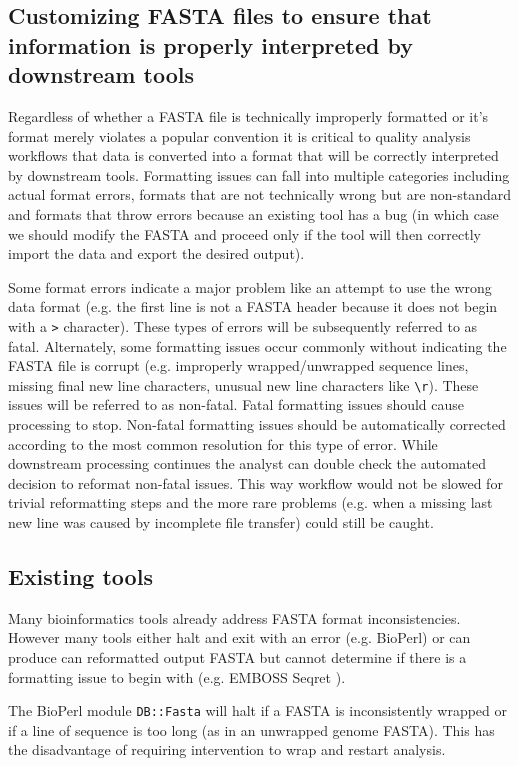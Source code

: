 \subsection{Customizing FASTA files to ensure that information is properly interpreted by downstream tools}

Regardless of whether a FASTA file is technically improperly formatted or it's format merely violates a popular convention it is critical to quality analysis workflows that data is converted into a format that will be correctly interpreted by downstream tools. Formatting issues can fall into multiple categories including actual format errors, formats that are not technically wrong but are non-standard and formats that throw errors because an existing tool has a bug (in which case we should modify the FASTA and proceed only if the tool will then correctly import the data and export the desired output). 

Some format errors indicate a major problem like an attempt to use the wrong data format (e.g. the first line is not a FASTA header because it does not begin with a \verb|>| character). These types of errors will be subsequently referred to as fatal. Alternately, some formatting issues occur commonly without indicating the FASTA file is corrupt (e.g. improperly wrapped/unwrapped sequence lines, missing final new line characters, unusual new line characters like \verb|\r|). These issues will be referred to as non-fatal. Fatal formatting issues should cause processing to stop. Non-fatal formatting issues should be automatically corrected according to the most common resolution for this type of error. While downstream processing continues the analyst can double check the automated decision to reformat non-fatal issues. This way workflow would not be slowed for trivial reformatting steps and the more rare problems (e.g. when a missing last new line was caused by incomplete file transfer) could still be caught.
  
\subsection{Existing tools}

Many bioinformatics tools already address FASTA format inconsistencies. However many tools either halt and exit with an error (e.g. BioPerl) or can produce can reformatted output FASTA but cannot determine if there is a formatting issue to begin with (e.g. EMBOSS Seqret \cite{PMID:10827456}). 

The BioPerl module \verb|DB::Fasta| will halt if a FASTA is inconsistently wrapped or if a line of sequence is too long (as in an unwrapped genome FASTA). This has the disadvantage of requiring intervention to wrap and restart analysis.

